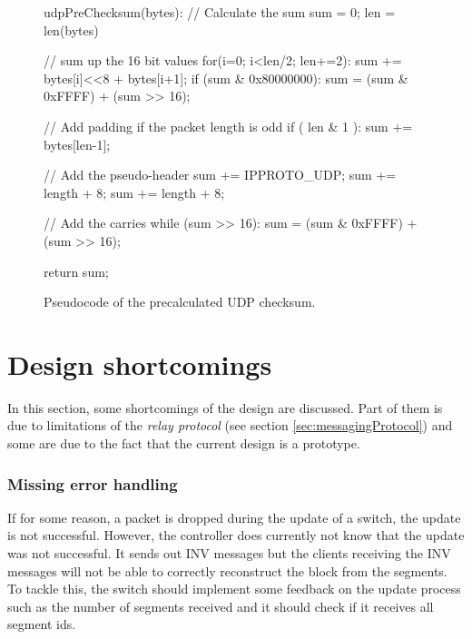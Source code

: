 \begin{figure}[tb]
\begin{center}
	\begin{PseudoCode}
udpPreChecksum(bytes):
    // Calculate the sum
    sum = 0;
    len = len(bytes)
    
    // sum up the 16 bit values
    for(i=0; i<len/2; len+=2):
        sum += bytes[i]<<8 + bytes[i+1];
        if (sum & 0x80000000):
            sum = (sum & 0xFFFF) + (sum >> 16);

    // Add padding if the packet length is odd
    if ( len & 1 ):
        sum += bytes[len-1];

    // Add the pseudo-header
    sum += IPPROTO_UDP;
    sum += length + 8;
    sum += length + 8;

    // Add the carries
    while (sum >> 16):
        sum = (sum & 0xFFFF) + (sum >> 16);

    return sum;
	\end{PseudoCode}
	\caption[Pseudocode of the precalculated UDP checksum]{Pseudocode of the precalculated UDP checksum. \label{code:udpchecksum}}
	\end{center}
\end{figure}





\section{Design shortcomings \label{sec:design:shortcomings}}
In this section, some shortcomings of the design are discussed. Part of them is due to limitations of the \textit{relay protocol} (see section \ref{sec:messagingProtocol}) and some are due to the fact that the current design is a prototype. 
\subsubsection{Missing error handling}
If for some reason, a packet is dropped during the update of a switch, the update is not successful. However, the controller does currently not know that the update was not successful. It sends out INV messages but the clients receiving the INV messages will not be able to correctly reconstruct the block from the segments. To tackle this, the switch should implement some feedback on the update process such as the number of segments received and it should check if it receives all segment ids.
